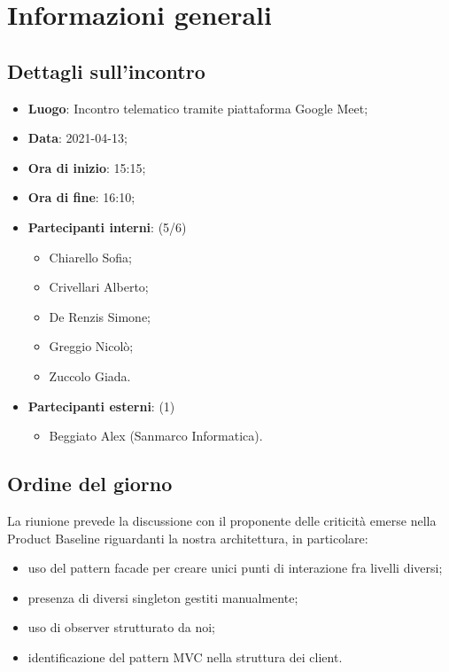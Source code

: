 \section{Informazioni generali}

\subsection{Dettagli sull'incontro}
\begin{itemize}
\item \textbf{Luogo}: Incontro telematico tramite piattaforma Google Meet;
\item \textbf{Data}: 2021-04-13;
\item \textbf{Ora di inizio}: 15:15;
\item \textbf{Ora di fine}: 16:10;
\item \textbf{Partecipanti interni}: (5/6)
\begin{itemize}
	\item Chiarello Sofia;
	\item Crivellari Alberto;
	\item De Renzis Simone;
	\item Greggio Nicolò;
	\item Zuccolo Giada.
\end{itemize}
\item \textbf{Partecipanti esterni}: (1)
\begin{itemize}
	\item Beggiato Alex (Sanmarco Informatica).
\end{itemize}
\end{itemize}

\subsection{Ordine del giorno}

La riunione prevede la discussione con il proponente delle criticità emerse nella Product Baseline riguardanti la nostra architettura, in particolare:
\begin{itemize}
    \item uso del pattern facade per creare unici punti di interazione fra livelli diversi;
    \item presenza di diversi singleton gestiti manualmente;
    \item uso di observer strutturato da noi;
    \item identificazione del pattern MVC nella struttura dei client.
\end{itemize}




